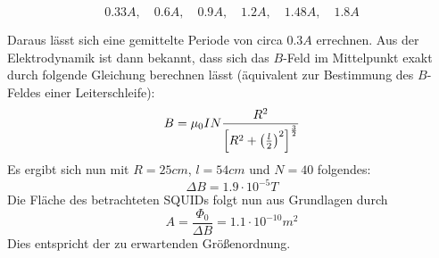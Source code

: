 		\[ 0.33\unit{A},\quad 0.6\unit{A},\quad 0.9\unit{A},\quad 1.2\unit{A},\quad 1.48\unit{A},\quad 1.8\unit{A} \]

		Daraus lässt sich eine gemittelte Periode von circa $0.3\unit{A}$ errechnen.
		Aus der Elektrodynamik ist dann bekannt, dass sich das $B$-Feld im Mittelpunkt exakt durch folgende Gleichung berechnen lässt (äquivalent zur Bestimmung des $B$-Feldes einer Leiterschleife):
		\[ B = \mu_0 IN \dfrac{R^2}{\left[ R^2 + \left( \frac{l}{2} \right)^2 \right]^{\frac{3}{2}}} \]
		Es ergibt sich nun mit $R=25\unit{cm}$, $l=54\unit{cm}$ und $N=40$ folgendes: 
		\[ \Delta B = 1.9\cdot 10^{-5}\unit{T} \]
		Die Fläche des betrachteten SQUIDs folgt nun aus Grundlagen durch
		\[ A = \dfrac{\Phi_0}{\Delta B} = 1.1\cdot 10^{-10}\unit{m}^2 \]
		Dies entspricht der zu erwartenden Größenordnung.



